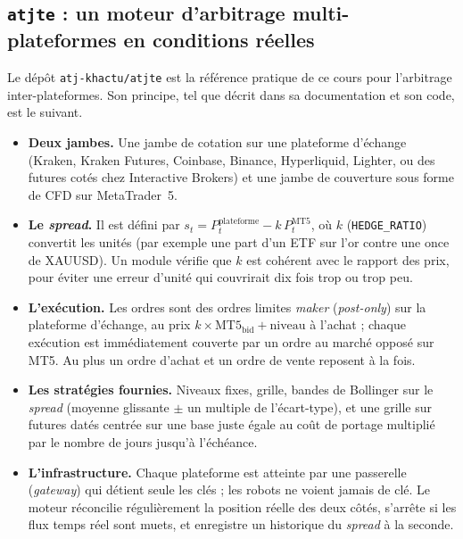 \documentclass[11pt,a4paper]{article}
\begin{document}
\subsection{\texttt{atjte} : un moteur d'arbitrage multi-plateformes en conditions réelles}

Le dépôt \texttt{atj-khactu/atjte} \citep{atjte} est la référence pratique de ce cours pour l'arbitrage inter-plateformes. Son principe, tel que décrit dans sa documentation et son code, est le suivant.

\begin{itemize}
\item \textbf{Deux jambes.} Une jambe de cotation sur une plateforme d'échange (Kraken, Kraken Futures, Coinbase, Binance, Hyperliquid, Lighter, ou des futures cotés chez Interactive Brokers) et une jambe de couverture sous forme de CFD sur MetaTrader~5.
\item \textbf{Le \emph{spread}.} Il est défini par $s_t = P^{\text{plateforme}}_t - k\,P^{\text{MT5}}_t$, où $k$ (\texttt{HEDGE\_RATIO}) convertit les unités (par exemple une part d'un ETF sur l'or contre une once de XAUUSD). Un module vérifie que $k$ est cohérent avec le rapport des prix, pour éviter une erreur d'unité qui couvrirait dix fois trop ou trop peu.
\item \textbf{L'exécution.} Les ordres sont des ordres limites \emph{maker} (\emph{post-only}) sur la plateforme d'échange, au prix $k\times\text{MT5}_{\text{bid}} + \text{niveau}$ à l'achat ; chaque exécution est immédiatement couverte par un ordre au marché opposé sur MT5. Au plus un ordre d'achat et un ordre de vente reposent à la fois.
\item \textbf{Les stratégies fournies.} Niveaux fixes, grille, bandes de Bollinger sur le \emph{spread} (moyenne glissante $\pm$ un multiple de l'écart-type), et une grille sur futures datés centrée sur une base \og juste\fg{} égale au coût de portage multiplié par le nombre de jours jusqu'à l'échéance.
\item \textbf{L'infrastructure.} Chaque plateforme est atteinte par une passerelle (\emph{gateway}) qui détient seule les clés ; les robots ne voient jamais de clé. Le moteur réconcilie régulièrement la position réelle des deux côtés, s'arrête si les flux temps réel sont muets, et enregistre un historique du \emph{spread} à la seconde.
\end{itemize}
\end{document}
